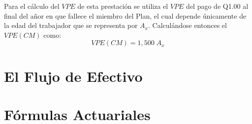 \documentclass[12pt,letterpaper,titlepage]{article}
\begin{document}
{Para el cálculo del $V\!PE$ de esta prestación se utiliza el $V\!PE$ del pago de Q1.00 al final del añor en que fallece el miembro del Plan, el cual depende únicamente de la edad del trabajador que se representa por $A_{x}$. Calculándose entonces el $V\!PE(CM)$ como:
\[ V\!PE(CM)=1,500\;A_{x} \]





\newpage
\section{El Flujo de Efectivo}


\newpage
\section{Fórmulas Actuariales}


\par}
\end{document}
